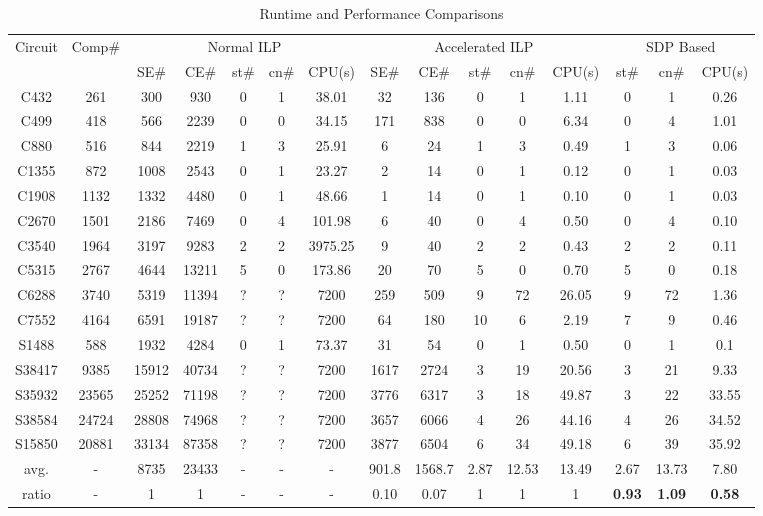 \documentclass[10pt,conference]{IEEEtran}
\begin{document}
\begin{table*}[tb]
\centering
\caption{Runtime and Performance Comparisons }
\label{tab:result1}
\begin{tabular}{|c|c|c|c|c|c|c|c|c|c|c|c|c|c|c|}
	\hline \hline
	Circuit	& Comp\#	& \multicolumn{5}{|c}{Normal ILP}				& \multicolumn{5}{|c|}{Accelerated ILP}	& \multicolumn{3}{|c|}{SDP Based}\\
	\cline{3-15}
			&			& SE\#	&CE\#	& st\#	& cn\#	& CPU(s)		& SE\#	&CE\#	& st\#	& cn\#& CPU(s)	& st\#& cn\#& CPU(s)\\
	\hline
	C432	& 261	& 300&930	& 0	& 1	& 38.01		& 32&136		& 0	& 1	& 1.11		&0&1& 0.26\\
	C499	& 418	& 566&2239	& 0	& 0	& 34.15		& 171&838	& 0	& 0	& 6.34		&0&4& 1.01\\
	C880	& 516	& 844&2219	& 1	& 3	& 25.91		& 6&24		& 1	& 3	& 0.49		&1&3& 0.06\\
	C1355	& 872	& 1008&2543	& 0	& 1	& 23.27		& 2&14		& 0	& 1	& 0.12		&0&1& 0.03\\
	C1908	& 1132	& 1332&4480	& 0	& 1	& 48.66		& 1&14		& 0	& 1	& 0.10		&0&1& 0.03\\
	C2670	& 1501	& 2186&7469	& 0	& 4	& 101.98		& 6&40		& 0	& 4	& 0.50		&0&4& 0.10\\
	C3540	& 1964	& 3197&9283	& 2	& 2	& 3975.25		& 9&40		& 2	& 2	& 0.43		&2&2& 0.11\\
	C5315	& 2767	& 4644&13211	& 5	& 0	& 173.86		& 20&70		& 5	& 0	& 0.70		&5&0& 0.18\\
	C6288	& 3740	& 5319&11394	& ?	& ?	&  7200	& 259&509	& 9	& 72	& 26.05		&9&72&1.36\\
	C7552	& 4164	& 6591&19187	& ?	& ?	&  7200	& 64&180		& 10	& 6	& 2.19		&7&9&0.46\\
	S1488	& 588	& 1932&4284	& 0	& 1	& 73.37		& 31&54		& 0	& 1	& 0.50		&0&1& 0.1\\
	S38417	& 9385	&15912&40734	& ?	& ?	&  7200	& 1617&2724	& 3	& 19	& 20.56		&3&21& 9.33\\
	S35932	& 23565	&25252&71198	& ?	& ?	&  7200	& 3776&6317	& 3	& 18	& 49.87		&3&22&33.55\\
	S38584	& 24724	&28808&74968	& ?	& ?	&  7200	& 3657&6066	& 4	& 26	& 44.16		&4&26&34.52\\
	S15850	& 20881	&33134&87358	& ?	& ?	&  7200	& 3877&6504	& 6	& 34	& 49.18		&6&39&35.92\\
	\hline
	avg.		& -		& 8735&23433	& -	& -			& -	&901.8&1568.7	&2.87&12.53&13.49		&2.67&13.73&7.80\\
	ratio		& -		& 1	& 1	& -	& -	& -			& 0.10&0.07	 & 1&1	    & 1		&\textbf{0.93}&\textbf{1.09}&\textbf{0.58}\\
	\hline \hline
\end{tabular}
\end{table*}
\end{document}
